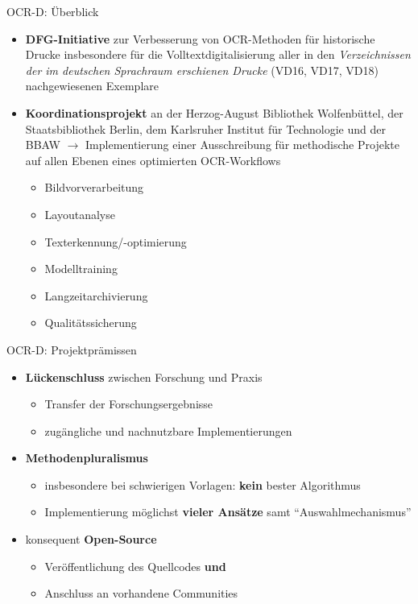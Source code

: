 \documentclass{bbawslides}
\begin{document}
\begin{bbawslide}{OCR-D: Überblick}
  \vspace*{2mm}%
  \centerslidestrue%
  \begin{itemize}
    \item \textbf{DFG-Initiative} zur Verbesserung von OCR-Methoden für historische Drucke insbesondere
          für die Volltextdigitalisierung aller in den \emph{Verzeichnissen der im deutschen
          Sprachraum erschienen Drucke} (VD16, VD17, VD18) nachgewiesenen Exemplare
    \item \textbf{Koordinationsprojekt} an der Herzog-August Bibliothek Wolfenbüttel, der Staatsbibliothek
          Berlin, dem Karlsruher Institut für Technologie und der BBAW $\rightarrow$ Implementierung
          einer Ausschreibung für methodische
          Projekte auf allen Ebenen eines optimierten OCR-Workflows
    \begin{itemize}\small
      \item Bildvorverarbeitung
      \item Layoutanalyse
      \item Texterkennung/-optimierung
      \item Modelltraining
      \item Langzeitarchivierung
      \item Qualitätssicherung
    \end{itemize}
  \end{itemize}
\end{bbawslide}

\begin{bbawslide}{OCR-D: Projektprämissen}
  \vspace*{7mm}%
  \centerslidestrue%
  \begin{itemize}
    \item \textbf{Lückenschluss} zwischen Forschung und Praxis
    \begin{itemize}\small
      \item Transfer der Forschungsergebnisse
      \item zugängliche und nachnutzbare Implementierungen
    \end{itemize}
    \item \textbf{Methodenpluralismus}
    \begin{itemize}\small
      \item insbesondere bei schwierigen Vorlagen: \textbf{kein} bester Algorithmus
      \item Implementierung möglichst \textbf{vieler Ansätze} samt \enquote{Auswahlmechanismus}
    \end{itemize}
    \item konsequent \textbf{Open-Source}
    \begin{itemize}\small
      \item Veröffentlichung des Quellcodes \textbf{und}
      \item Anschluss an vorhandene Communities
    \end{itemize}
  \end{itemize}
\end{bbawslide}
\end{document}
